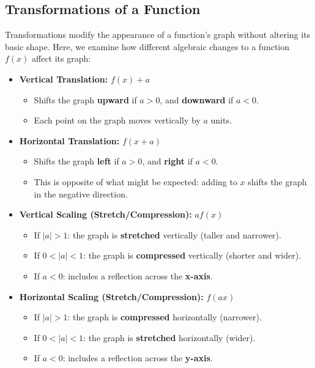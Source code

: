 \subsection{Transformations of a Function}

Transformations modify the appearance of a function's graph without altering its basic shape. Here, we examine how different algebraic changes to a function \( f(x) \) affect its graph:

\begin{itemize}
    \item \textbf{Vertical Translation:} \( f(x) + a \)
    \begin{itemize}
        \item Shifts the graph \textbf{upward} if \( a > 0 \), and \textbf{downward} if \( a < 0 \).
        \item Each point on the graph moves vertically by \( a \) units.
    \end{itemize}

    \item \textbf{Horizontal Translation:} \( f(x + a) \)
    \begin{itemize}
        \item Shifts the graph \textbf{left} if \( a > 0 \), and \textbf{right} if \( a < 0 \).
        \item This is opposite of what might be expected: adding to \( x \) shifts the graph in the negative direction.
    \end{itemize}

    \item \textbf{Vertical Scaling (Stretch/Compression):} \( a f(x) \)
    \begin{itemize}
        \item If \( |a| > 1 \): the graph is \textbf{stretched} vertically (taller and narrower).
        \item If \( 0 < |a| < 1 \): the graph is \textbf{compressed} vertically (shorter and wider).
        \item If \( a < 0 \): includes a reflection across the \textbf{x-axis}.
    \end{itemize}

    \item \textbf{Horizontal Scaling (Stretch/Compression):} \( f(a x) \)
    \begin{itemize}
        \item If \( |a| > 1 \): the graph is \textbf{compressed} horizontally (narrower).
        \item If \( 0 < |a| < 1 \): the graph is \textbf{stretched} horizontally (wider).
        \item If \( a < 0 \): includes a reflection across the \textbf{y-axis}.
    \end{itemize}


\end{itemize}
